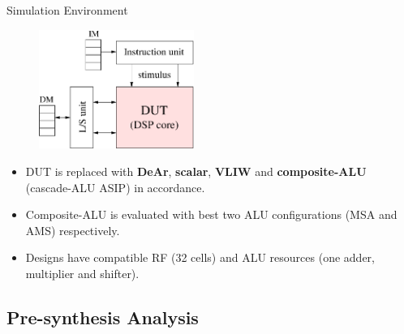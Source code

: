 \documentclass{beamer}
\begin{document}
\begin{CJK}{UTF8}{bkai}
            \begin{frame}{Simulation Environment}
                \begin{figure}[!ht] 
                    \centering
                    \includegraphics[width=0.45\textwidth]{./figs/sim.eps}
                \end{figure}
                \begin{itemize}
                    \item <2->{DUT is replaced with \textbf{DeAr}, \textbf{scalar}, \textbf{VLIW} and \textbf{composite-ALU} (cascade-ALU ASIP) in accordance.}
                    \item <3->{Composite-ALU is evaluated with best two ALU configurations (MSA and AMS) respectively.}
                    \item <4->{Designs have compatible RF (32 cells) and ALU resources (one adder, multiplier and shifter).}
                \end{itemize}
            \end{frame}

            \subsection{Pre-synthesis Analysis}


\end{CJK}
\end{document}

